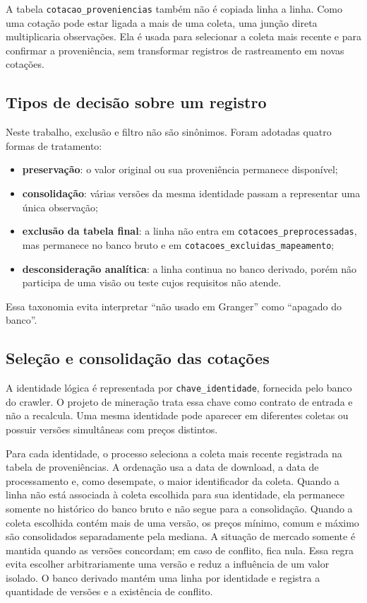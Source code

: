 \documentclass[12pt,a4paper]{article}
\begin{document}
A tabela \texttt{cotacao\_proveniencias} também não é copiada linha a linha.
Como uma cotação pode estar ligada a mais de uma coleta, uma junção direta
multiplicaria observações. Ela é usada para selecionar a coleta mais recente e
para confirmar a proveniência, sem transformar registros de rastreamento em
novas cotações.

\subsection{Tipos de decisão sobre um registro}

Neste trabalho, exclusão e filtro não são sinônimos. Foram adotadas quatro
formas de tratamento:

\begin{itemize}
    \item \textbf{preservação}: o valor original ou sua proveniência permanece
    disponível;
    \item \textbf{consolidação}: várias versões da mesma identidade passam a
    representar uma única observação;
    \item \textbf{exclusão da tabela final}: a linha não entra em
    \texttt{cotacoes\_preprocessadas}, mas permanece no banco bruto e em
    \texttt{cotacoes\_excluidas\_mapeamento};
    \item \textbf{desconsideração analítica}: a linha continua no banco
    derivado, porém não participa de uma visão ou teste cujos requisitos não
    atende.
\end{itemize}

Essa taxonomia evita interpretar ``não usado em Granger'' como ``apagado do
banco''.

\subsection{Seleção e consolidação das cotações}

A identidade lógica é representada por \texttt{chave\_identidade}, fornecida
pelo banco do crawler. O projeto de mineração trata essa chave como contrato de
entrada e não a recalcula. Uma mesma identidade pode aparecer em diferentes
coletas ou possuir versões simultâneas com preços distintos.

Para cada identidade, o processo seleciona a coleta mais recente registrada na
tabela de proveniências. A ordenação usa a data de download, a data de
processamento e, como desempate, o maior identificador da coleta. Quando a
linha não está associada à coleta escolhida para sua identidade, ela permanece
somente no histórico do banco bruto e não segue para a consolidação. Quando a
coleta escolhida contém mais de uma versão, os preços mínimo, comum e máximo
são consolidados separadamente pela mediana. A situação de mercado somente é
mantida quando as versões concordam; em caso de conflito, fica nula. Essa regra
evita escolher arbitrariamente uma versão e reduz a influência de um valor
isolado. O banco derivado mantém uma linha por identidade e registra a
quantidade de versões e a existência de conflito.
\end{document}
